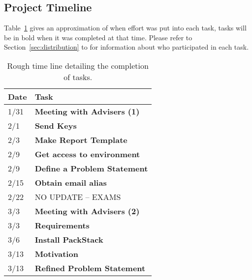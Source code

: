 \subsection{Project Timeline}
\label{sec:timeline}

Table~\ref{tab:timeline} gives an approximation of when effort was put 
into each task, tasks will be in bold when it was completed at that
time. Please refer to Section~\ref{sec:distribution} to for information
about who participated in each task.

\begin{center}
\begin{adjustwidth}[]{-1in}{-1in}
  \begin{table}[H]
    \caption{Rough time line detailing the completion of tasks.}\label{tab:timeline}
    \begin{tabularx}{\textwidth}{| p{3cm} | X |}
      \hline
      Date & Task \\ \hline
      
      1/31 & \textbf{Meeting with Advisers (1)} \\ \hline

      2/1 & \textbf{Send Keys} \\ \hline

      2/3 & \textbf{Make Report Template} \\ \hline

      2/9 & \textbf{Get access to environment} \\ \hline

      2/9 & \textbf{Define a Problem Statement} \\ \hline

      2/15 & \textbf{Obtain email alias} \\ \hline

      2/22 & NO UPDATE -- EXAMS \\ \hline

      3/3 & \textbf{Meeting with Advisers (2)} \\ \hline

      3/3 & \textbf{Requirements} \\ \hline

      3/6 & \textbf{Install PackStack} \\ \hline

      3/13 & \textbf{Motivation} \\ \hline

      3/13 & \textbf{Refined Problem Statement} \\ \hline


\end{tabularx}
\end{table}
\end{adjustwidth}
\end{center}
